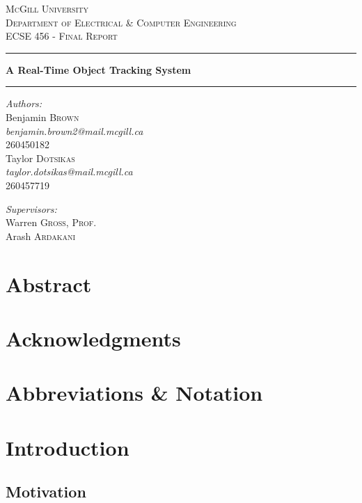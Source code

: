 \documentclass[12pt]{article} %
\newcommand{\HRule}[1][\medskipamount]{\par
  \vspace*{\dimexpr-\parskip-\baselineskip+#1}
  \noindent\rule{\linewidth}{0.2mm}\par
  \vspace*{\dimexpr-\parskip-.5\baselineskip+#1}}
\begin{document}
\begin{titlepage}
\begin{center}
\textsc{\huge McGill University}\\[1.5cm]
\textsc{\LARGE Department of Electrical \& Computer Engineering}\\[1.5cm]
\textsc{\Large ECSE 456 - Final Report}\\[3cm]
\HRule
{\huge \bfseries A Real-Time Object Tracking System \\[.8cm] }
\HRule 
\vspace{1.5cm}
\noindent
\begin{minipage}{0.4\textwidth}
\begin{flushleft} \large
\emph{\Large Authors:}\\
Benjamin \textsc{Brown} \\
\textit{benjamin.brown2@mail.mcgill.ca} \\
260450182 \\
Taylor \textsc{Dotsikas} \\
\textit{taylor.dotsikas@mail.mcgill.ca} \\
260457719
\end{flushleft}
\begin{flushleft} \large
\emph{\Large Supervisors:}\\
Warren \textsc{Gross, Prof.}\\
Arash \textsc{Ardakani} 
\end{flushleft}
\end{minipage}%
\end{center}
\end{titlepage}
\pagebreak
\section*{Abstract}
\section*{Acknowledgments}
\pagebreak
\tableofcontents
\pagebreak
\section{Abbreviations \& Notation}
\section{Introduction}
\subsection{Motivation}
\end{document}
